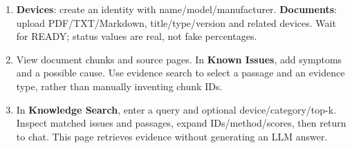 \begin{enumerate}[resume]
\item \textbf{Devices}: create an identity with name/model/manufacturer. \textbf{Documents}: upload PDF/TXT/Markdown, title/type/version and related devices. Wait for READY; status values are real, not fake percentages.
\item View document chunks and source pages. In \textbf{Known Issues}, add symptoms and a possible cause. Use evidence search to select a passage and an evidence type, rather than manually inventing chunk IDs.
\item In \textbf{Knowledge Search}, enter a query and optional device/category/top-k. Inspect matched issues and passages, expand IDs/method/scores, then return to chat. This page retrieves evidence without generating an LLM answer.
\end{enumerate}
